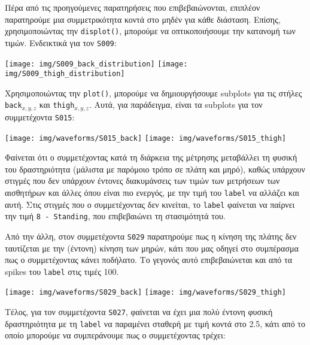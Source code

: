        Πέρα από τις προηγούμενες παρατηρήσεις που επιβεβαιώνονται, επιπλέον παρατηρούμε μια συμμετρικότητα κοντά στο μηδέν
        για κάθε διάσταση. Επίσης, χρησιμοποιώντας την \texttt{displot()}, μπορούμε να οπτικοποιήσουμε την κατανομή των τιμών.
        Ενδεικτικά για τον \texttt{S009}:

        \begin{multicols}{2} \centering
            \texttt{[image: img/S009\_back\_distribution]}
            \texttt{[image: img/S009\_thigh\_distribution]}
        \end{multicols}

        Χρησιμοποιώντας την \texttt{plot()}, μπορούμε να δημιουργήσουμε subplots για τις στήλες \texttt{back}\(_{x,y,z}\)
        και \texttt{thigh}\(_{x,y,z}\). Αυτά, για παράδειγμα, είναι τα subplots για τον συμμετέχοντα \texttt{S015}:

        \begin{multicols}{2} \centering
            \noindent\texttt{[image: img/waveforms/S015\_back]}
            \texttt{[image: img/waveforms/S015\_thigh]}
        \end{multicols}

        Φαίνεται ότι ο συμμετέχοντας κατά τη διάρκεια της μέτρησης μεταβάλλει τη φυσική του δραστηριότητα (μάλιστα με παρόμοιο τρόπο σε πλάτη και μηρό),
        καθώς υπάρχουν στιγμές που δεν υπάρχουν έντονες διακυμάνσεις των τιμών των μετρήσεων των αισθητήρων και άλλες όπου είναι πιο ενεργός,
        με την τιμή του \texttt{label} να αλλάζει και αυτή. Στις στιγμές που ο συμμετέχοντας δεν κινείται, το \texttt{label}
        φαίνεται να παίρνει την τιμή \texttt{8 - Standing}, που επιβεβαιώνει τη στασιμότητά του.

        Από την άλλη, στον συμμετέχοντα \texttt{S029} παρατηρούμε πως η κίνηση της πλάτης δεν ταυτίζεται με την (έντονη) κίνηση των μηρών,
        κάτι που μας οδηγεί στο συμπέρασμα πως ο συμμετέχοντας κάνει ποδήλατο.
        Το γεγονός αυτό επιβεβαιώνεται και από τα spikes του \texttt{label} στις τιμές 100.

        \pagebreak
        \begin{multicols}{2} \centering
            \noindent\texttt{[image: img/waveforms/S029\_back]}
            \texttt{[image: img/waveforms/S029\_thigh]}
        \end{multicols}

        Τέλος, για τον συμμετέχοντα \texttt{S027}, φαίνεται να έχει μια πολύ έντονη φυσική δραστηριότητα με τη \texttt{label}
        να παραμένει σταθερή με τιμή κοντά στο 2.5, κάτι από το οποίο μπορούμε να συμπεράνουμε πως ο συμμετέχοντας τρέχει:

